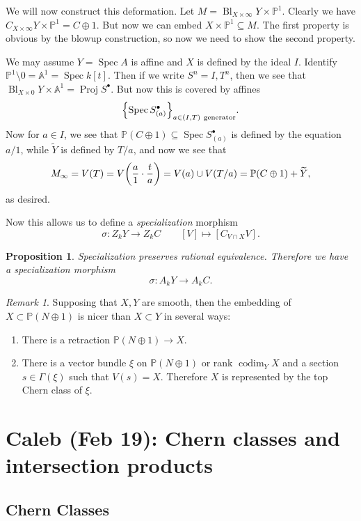 \documentclass[leqno, openany]{memoir}
\newtheorem{prop}[thm]{Proposition}
\theoremstyle{definition}
\theoremstyle{remark}
\newtheorem{rmk}[thm]{Remark}
\theoremstyle{plain}
\theoremstyle{definition}
\theoremstyle{remark}
\newcommand{\A}{\mathbb{A}}
\renewcommand{\P}{\mathbb{P}}
\newcommand{\wt}[1]{\widetilde{#1}}
\DeclareMathOperator{\Spec}{Spec}
\DeclareMathOperator{\Proj}{Proj}
\DeclareMathOperator{\Bl}{Bl}
\begin{document}
We will now construct this deformation. Let $M = \Bl_{X \times \infty} Y \times
\P^1$. Clearly we have $C_{X \times \infty} Y \times \P^1 = C \oplus 1$. But
now we can embed $X \times \P^1 \subseteq M$. The first property is obvious by
the blowup construction, so now we need to show the second property.

We may assume $Y = \Spec A$ is affine and $X$ is defined by the ideal $I$.
Identify $\P^1 \setminus 0 = \A^1 = \Spec k[t]$. Then if we write $S^n =
{I,T}^n$, then we see that $\Bl_{X \times 0} Y \times \A^1 = \Proj
S^{\bullet}$. But now this is covered by affines \[ \qty{\Spec
S^{\bullet}_{(a)}}_{a \in (I, T)\ \text{generator}}. \] Now for $a \in I$, we
see that $\P(C \oplus 1) \subseteq \Spec S^{\bullet}_{(a)}$ is defined by the
equation $a/1$, while $\wt{Y}$ is defined by $T/a$, and now we see that \[
M_{\infty} = V(T) = V\qty(\frac{a}{1} \cdot \frac{t}{a}) = V(a) \cup V(T/a) =
\P(C \oplus 1) + \wt{Y}, \] as desired.

Now this allows us to define a \textit{specialization} morphism \[ \sigma
    \colon Z_k Y \to Z_k C \qquad [V] \mapsto [C_{V \cap X} V]. \] \begin{prop}
    Specialization preserves rational equivalence. Therefore we have a
    specialization morphism \[ \sigma \colon A_k Y \to A_k C. \] \end{prop}

\begin{rmk} Supposing that $X, Y$ are smooth, then the embedding of $X \subset
    \P(N \oplus 1)$ is nicer than $X \subset Y$ in several ways:
    \begin{enumerate} \item There is a retraction $\P(N \oplus 1) \to X$.
        \item There is a vector bundle $\xi$ on $\P(N \oplus 1)$ or rank
            $\operatorname{codim}_Y X$ and a section $s \in \Gamma(\xi)$ such
            that $V(s) = X$. Therefore $X$ is represented by the top Chern
            class of $\xi$.  \end{enumerate} \end{rmk}

\chapter{Caleb (Feb 19): Chern classes and intersection products}%
\label{cha:caleb_feb_19_chern_classes_and_intersection_products}

\section{Chern Classes}%
\end{document}
